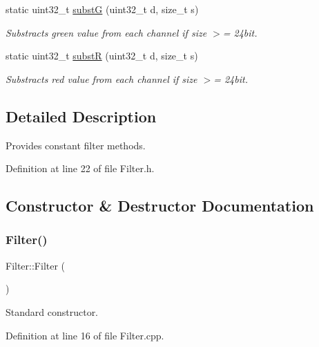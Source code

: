 \begin{DoxyCompactItemize}
static uint32\+\_\+t \mbox{\hyperlink{classFilter_afc6fee2bd138d157986ef3e2f2907186}{substG}} (uint32\+\_\+t d, size\+\_\+t s)
\begin{DoxyCompactList}\small\item\em Substracts green value from each channel if size $>$= 24bit. \end{DoxyCompactList}\item 
static uint32\+\_\+t \mbox{\hyperlink{classFilter_a773ee633720080079d6a17ac610d353d}{substR}} (uint32\+\_\+t d, size\+\_\+t s)
\begin{DoxyCompactList}\small\item\em Substracts red value from each channel if size $>$= 24bit. \end{DoxyCompactList}\end{DoxyCompactItemize}


\subsection{Detailed Description}
Provides constant filter methods. 

Definition at line 22 of file Filter.\+h.



\subsection{Constructor \& Destructor Documentation}
\mbox{\label{classFilter_ad15994c30d497afd567a6445446a249e}} 
\subsubsection{\texorpdfstring{Filter()}{Filter()}\hspace{0.1cm}{\footnotesize\ttfamily [1/2]}}
{\footnotesize\ttfamily Filter\+::\+Filter (\begin{DoxyParamCaption}{ }\end{DoxyParamCaption})}



Standard constructor. 



Definition at line 16 of file Filter.\+cpp.

\mbox{\label{classFilter_a6ed476659596aa4bc61e69514960d95b}} 
